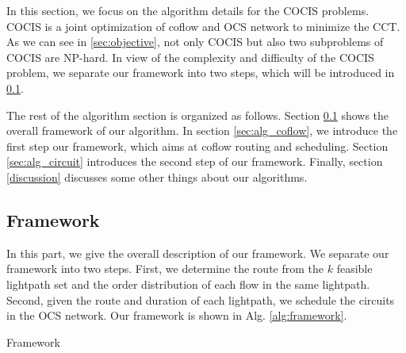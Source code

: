 In this section, we focus on the algorithm details for the COCIS problems. COCIS is a joint optimization of coflow and OCS network to minimize the CCT. As we can see in \ref{sec:objective}, not only COCIS but also two subproblems of COCIS are NP-hard. In view of the complexity and difficulty of the COCIS problem, we separate our framework into two steps, which will be introduced in \ref{sec:framework}.

The rest of the algorithm section is organized as follows. Section \ref{sec:framework} shows the overall framework of our algorithm. In section \ref{sec:alg_coflow}, we introduce the first step our framework, which aims at coflow routing and scheduling. Section \ref{sec:alg_circuit} introduces the second step of our framework. Finally, section \ref{discussion} discusses some other things about our algorithms.
\subsection{Framework}\label{sec:framework}
In this part, we give the overall description of our framework. We separate our framework into two steps. First, we determine the route from the $k$ feasible lightpath set and the order distribution of each flow in the same lightpath. Second, given the route and duration of each lightpath, we schedule the circuits in the OCS network. Our framework is shown in Alg. \ref{alg:framework}.
{\small
\begin{algorithm}
\caption{ Framework     }\label{alg:framework}
\begin{algorithmic}[1]


\end{algorithmic}
\end{algorithm}
}


